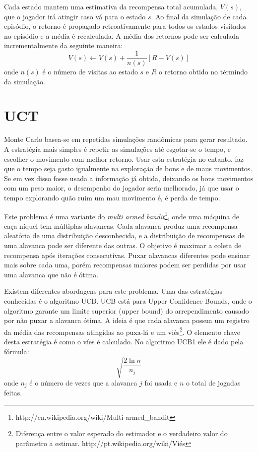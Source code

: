 Cada estado mantem uma estimativa da recompensa total acumulada, $V(s)$, que o jogador irá atingir caso vá para o estado $s$. Ao final da simulação de cada episódio, o retorno é propagado retroativamente para todos os estados visitados no episódio e a média é recalculada. A média dos retornos pode ser calculada incrementalmente da seguinte maneira:
\begin{equation}
V(s) \leftarrow V(s) + \frac{1}{n(s)}[R - V(s)]
\end{equation}
onde $n(s)$ é o número de visitas ao estado $s$ e $R$ o retorno obtido no términdo da simulação. 

\section{UCT}
Monte Carlo basea-se em repetidas simulações randômicas para gerar resultado. A estratégia mais simples é repetir as simulações até esgotar-se o tempo, e escolher o movimento com melhor retorno. Usar esta estratégia no entanto, faz que o tempo seja gasto igualmente na exploração de bons e de maus movimentos. Se em vez disso fosse usada a informação já obtida, deixando os bons movimentos com um peso maior, o desempenho do jogador seria melhorado, já que usar o tempo explorando quão ruim um mau movimento é, é perda de tempo. 

Este problema é uma variante do \textit{multi armed bandit}\footnote{http://en.wikipedia.org/wiki/Multi-armed\_bandit}, onde uma máquina de caça-níquel tem múltiplas alavancas. Cada alavanca produz uma recompensa aleatória de uma distribuição desconhecida, e a distribuição de recompensas de uma alavanca pode ser diferente das outras. O objetivo é maximar a coleta de recompensa após iterações consecutivas. Puxar alavancas diferentes pode ensinar mais sobre cada uma, porém recompensas maiores podem ser perdidas por usar uma alavanca que não é ótima.

Existem diferentes abordagens para este problema. Uma das estratégias conhecidas é o algoritmo UCB\cite{ucb}. UCB está para Upper Confidence Bounds, onde o algoritmo garante um limite superior (upper bound) do arrependimento causado por não puxar a alavanca ótima. A ideia é que cada alavanca possua um registro da média das recompensas atingidas ao puxa-lá e um viés\footnote{Diferença entre o valor esperado do estimador e o verdadeiro valor do parâmetro a estimar. http://pt.wikipedia.org/wiki/Viés}. O elemento chave desta estratégia é como o víes é calculado. No algoritmo UCB1 ele é dado pela fórmula:
\begin{equation}
\sqrt{\frac{2\ln n}{n_{j}}}
\end{equation}
onde $n_{j}$ é o número de vezes que a alavanca $j$ foi usada e $n$ o total de jogadas feitas. 

